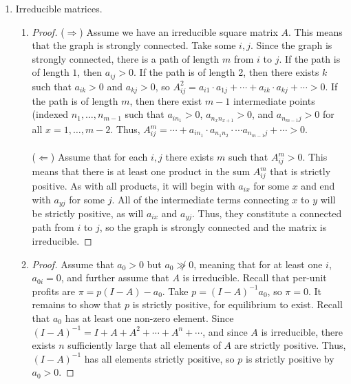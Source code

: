 \documentclass[10pt]{article}
\begin{document}
\begin{enumerate}
	\item Irreducible matrices. \begin{enumerate} \item \begin{proof} ($\Rightarrow$) Assume we have an irreducible square matrix $A$. This means that the graph is strongly connected. Take some $i,j$. Since the graph is strongly connected, there is a path of length $m$ from $i$ to $j$. If the path is of length $1$, then $a_{ij} > 0$. If the path is of length 2, then there exists $k$ such that $a_{ik} > 0$ and $a_{kj} > 0$, so $A^2_{ij} = a_{i1} \cdot a_{1j} + \cdots + a_{ik} \cdot a_{kj} + \cdots > 0$. If the path is of length $m$, then there exist $m-1$ intermediate points (indexed $n_1,\dots,n_{m-1}$ such that $a_{in_1} > 0$, $a_{n_xn_{x+1}} > 0$, and $a_{n_{m-1}j} > 0$ for all $x = 1,\dots,m-2$. Thus, $A^m_{ij} = \cdots + a_{in_1} \cdot a_{n_1n_2} \cdot \cdots a_{n_{m-1}j} + \cdots > 0$. \\\\ ($\Leftarrow$) Assume that for each $i,j$ there exists $m$ such that $A^m_{ij} > 0$. This means that there is at least one product in the sum $A^m_{ij}$ that is strictly positive. As with all products, it will begin with $a_{ix}$ for some $x$ and end with $a_{yj}$ for some $j$. All of the intermediate terms connecting $x$ to $y$ will be strictly positive, as will $a_{ix}$ and $a_{yj}$. Thus, they constitute a connected path from $i$ to $j$, so the graph is strongly connected and the matrix is irreducible. \end{proof} \item \begin{proof} Assume that $a_0 > 0$ but $a_0 \not\gg 0$, meaning that for at least one $i$, $a_{0i} = 0$, and further assume that $A$ is irreducible. Recall that per-unit profits are $\pi = p(I-A) - a_0$. Take $p = (I-A)^{-1}a_0$, so $\pi =0$. It remains to show that $p$ is strictly positive, for equilibrium to exist. Recall that $a_0$ has at least one non-zero element. Since $(I-A)^{-1} = I + A + A^2 + \cdots + A^n + \cdots$, and since $A$ is irreducible, there exists $n$ sufficiently large that all elements of $A$ are strictly positive. Thus, $(I-A)^{-1}$ has all elements strictly positive, so $p$ is strictly positive by $a_0 > 0$.\end{proof}\end{enumerate}
\end{enumerate}
\end{document}

